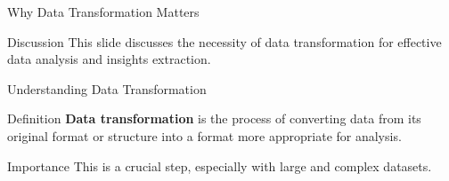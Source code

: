 \documentclass[aspectratio=169]{beamer}
\begin{document}
\begin{frame}[fragile]{Why Data Transformation Matters}
    \begin{block}{Discussion}
        This slide discusses the necessity of data transformation for effective data analysis and insights extraction.
    \end{block}
\end{frame}

\begin{frame}[fragile]{Understanding Data Transformation}
    \begin{block}{Definition}
        \textbf{Data transformation} is the process of converting data from its original format or structure into a format more appropriate for analysis.
    \end{block}
    
    \begin{block}{Importance}
        This is a crucial step, especially with large and complex datasets.
    \end{block}
\end{frame}
\end{document}
